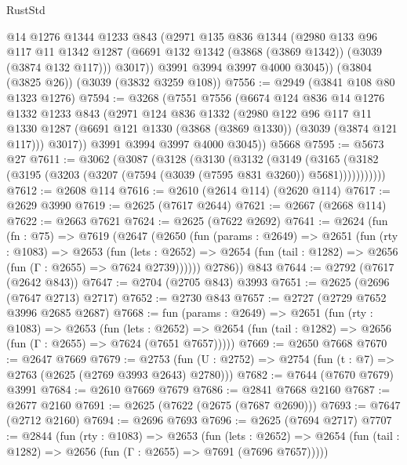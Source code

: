 \begin{lexlean}{RustStd}
\begin{coremodule}
        @14
        @1276
        @1344
        @1233
        @843
        (@2971
          @135
          @836
          @1344
          (@2980
            @133
            @96
            @117
            @11
            @1342
            @1287
            (@6691 @132 @1342 (@3868 (@3869 @1342)) (@3039 (@3874 @132 @117)))
            @3017))
        @3991
        @3994
        @3997
        @4000
        @3045))
    (@3804 (@3825 @26))
    (@3039 (@3832 @3259 @108))
@7556 := @2949 (@3841 @108 @80 @1323 @1276)
@7594 := @3268
    (@7551
      @7556
      (@6674
        @124
        @836
        @14
        @1276
        @1332
        @1233
        @843
        (@2971
          @124
          @836
          @1332
          (@2980
            @122
            @96
            @117
            @11
            @1330
            @1287
            (@6691 @121 @1330 (@3868 (@3869 @1330)) (@3039 (@3874 @121 @117)))
            @3017))
        @3991
        @3994
        @3997
        @4000
        @3045))
    @5668
@7595 := @5673 @27
@7611 := @3062
    (@3087
      (@3128
        (@3130
          (@3132
            (@3149
              (@3165 (@3182 (@3195 (@3203 (@3207 (@7594 (@3039 (@7595 @831 @3260)) @5681)))))))))))
@7612 := @2608 @114
@7616 := @2610 (@2614 @114) (@2620 @114)
@7617 := @2629 @3990
@7619 := @2625 (@7617 @2644)
@7621 := @2667 (@2668 @114)
@7622 := @2663 @7621
@7624 := @2625 (@7622 @2692)
@7641 := @2624
    (fun (fn : @75) =>
    @7619
      (@2647
        (@2650
          (fun (params : @2649) =>
          @2651
            (fun (rty : @1083) =>
            @2653
              (fun (lets : @2652) =>
              @2654 (fun (tail : @1282) => @2656 (fun (Γ : @2655) => @7624 @2739))))))
        @2786))
    @843
@7644 := @2792 (@7617 (@2642 @843))
@7647 := @2704 (@2705 @843) @3993
@7651 := @2625 (@2696 (@7647 @2713) @2717)
@7652 := @2730 @843
@7657 := @2727 (@2729 @7652 @3996 @2685 @2687)
@7668 := fun (params : @2649) =>
  @2651
    (fun (rty : @1083) =>
    @2653
      (fun (lets : @2652) =>
      @2654 (fun (tail : @1282) => @2656 (fun (Γ : @2655) => @7624 (@7651 @7657)))))
@7669 := @2650 @7668
@7670 := @2647 @7669
@7679 := @2753 (fun (U : @2752) => @2754 (fun (t : @7) => @2763 (@2625 (@2769 @3993 @2643) @2780)))
@7682 := @7644 (@7670 @7679) @3991
@7684 := @2610 @7669 @7679
@7686 := @2841 @7668 @2160
@7687 := @2677 @2160
@7691 := @2625 (@7622 (@2675 (@7687 @2690)))
@7693 := @7647 (@2712 @2160)
@7694 := @2696 @7693
@7696 := @2625 (@7694 @2717)
@7707 := @2844
    (fun (rty : @1083) =>
    @2653
      (fun (lets : @2652) =>
      @2654 (fun (tail : @1282) => @2656 (fun (Γ : @2655) => @7691 (@7696 @7657)))))

\end{coremodule}
\end{lexlean}
